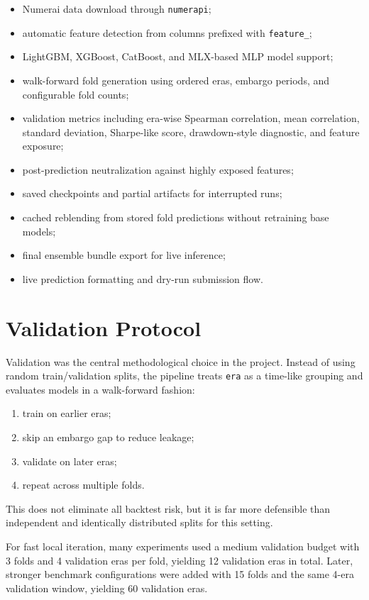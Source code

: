 \documentclass[11pt]{article}
\begin{document}
\begin{itemize}[leftmargin=1.5em]
  \item Numerai data download through \texttt{numerapi};
  \item automatic feature detection from columns prefixed with \texttt{feature\_};
  \item LightGBM, XGBoost, CatBoost, and MLX-based MLP model support;
  \item walk-forward fold generation using ordered eras, embargo periods, and configurable fold counts;
  \item validation metrics including era-wise Spearman correlation, mean correlation, standard deviation, Sharpe-like score, drawdown-style diagnostic, and feature exposure;
  \item post-prediction neutralization against highly exposed features;
  \item saved checkpoints and partial artifacts for interrupted runs;
  \item cached reblending from stored fold predictions without retraining base models;
  \item final ensemble bundle export for live inference;
  \item live prediction formatting and dry-run submission flow.
\end{itemize}

\section{Validation Protocol}

Validation was the central methodological choice in the project. Instead of using random train/validation splits, the pipeline treats \texttt{era} as a time-like grouping and evaluates models in a walk-forward fashion:

\begin{enumerate}[leftmargin=1.5em]
  \item train on earlier eras;
  \item skip an embargo gap to reduce leakage;
  \item validate on later eras;
  \item repeat across multiple folds.
\end{enumerate}

This does not eliminate all backtest risk, but it is far more defensible than independent and identically distributed splits for this setting.

For fast local iteration, many experiments used a medium validation budget with 3 folds and 4 validation eras per fold, yielding 12 validation eras in total. Later, stronger benchmark configurations were added with 15 folds and the same 4-era validation window, yielding 60 validation eras.
\end{document}
